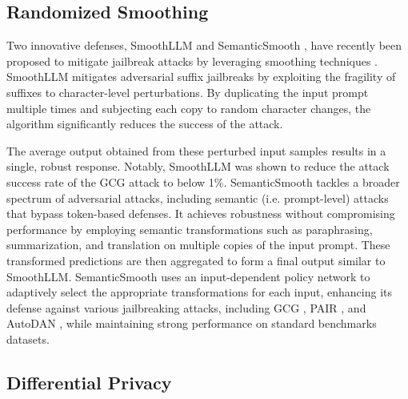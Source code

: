 \subsection{Randomized Smoothing}

Two innovative defenses, SmoothLLM \cite{robey_2023a} and SemanticSmooth \cite{ji_2024b}, have recently been proposed to mitigate jailbreak attacks by leveraging smoothing techniques \cite{cohen_2019a}. SmoothLLM mitigates adversarial suffix jailbreaks by exploiting the fragility of suffixes to character-level perturbations. By duplicating the input prompt multiple times and subjecting each copy to random character changes, the algorithm significantly reduces the success of the attack.

The average output obtained from these perturbed input samples results in a single, robust response. Notably, SmoothLLM was shown to reduce the attack success rate of the GCG attack \cite{zou_2023a} to below 1\%. SemanticSmooth tackles a broader spectrum of adversarial attacks, including semantic (i.e. prompt-level) attacks that bypass token-based defenses. It achieves robustness without compromising performance by employing semantic transformations such as paraphrasing, summarization, and translation on multiple copies of the input prompt. These transformed predictions are then aggregated to form a final output similar to SmoothLLM. SemanticSmooth uses an input-dependent policy network to adaptively select the appropriate transformations for each input, enhancing its defense against various jailbreaking attacks, including GCG \cite{zou_2023a}, PAIR \cite{chao_2023a}, and AutoDAN \cite{liu_2024b}, while maintaining strong performance on standard benchmarks datasets.

\subsection{Differential Privacy}

